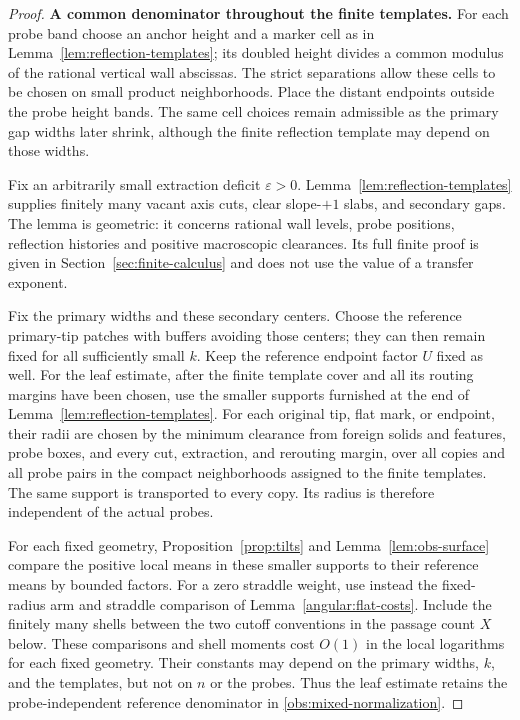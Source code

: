 \begin{proof}
\textbf{A common denominator throughout the finite templates.}\quad
For each probe band choose an anchor height and a marker cell as in
Lemma~\ref{lem:reflection-templates}; its doubled height divides a
common modulus of the rational vertical wall abscissas.  The strict
separations allow these cells to be chosen on small product
neighborhoods.  Place the distant endpoints outside the probe height
bands.  The same cell choices remain admissible as the primary gap
widths later shrink, although the finite reflection template may
depend on those widths.

Fix an arbitrarily small extraction deficit $\varepsilon>0$.
Lemma~\ref{lem:reflection-templates} supplies finitely many vacant
axis cuts, clear slope-$+1$ slabs, and secondary gaps.  The lemma is
geometric: it concerns rational wall levels, probe positions,
reflection histories and positive macroscopic clearances.  Its full
finite proof is given in Section~\ref{sec:finite-calculus} and does
not use the value of a transfer exponent.

Fix the primary widths and these secondary centers.  Choose the
reference primary-tip patches with buffers avoiding those centers;
they can then remain fixed for all sufficiently small $k$.  Keep
the reference endpoint factor $U$ fixed as well.  For the leaf
estimate, after the finite template cover and all its routing
margins have been chosen, use the smaller supports furnished at the
end of Lemma~\ref{lem:reflection-templates}.  For each original
tip, flat mark, or endpoint, their radii are chosen by the minimum
clearance from foreign solids and features, probe boxes, and every
cut, extraction, and rerouting margin, over all copies and all probe
pairs in the compact neighborhoods assigned to the finite templates.
The same support is transported to every copy.  Its radius is
therefore independent of the actual probes.

For each fixed geometry, Proposition~\ref{prop:tilts} and
Lemma~\ref{lem:obs-surface} compare the positive local means in
these smaller supports to their reference means by bounded factors.
For a zero straddle weight, use instead the fixed-radius arm and
straddle comparison of Lemma~\ref{angular:flat-costs}.  Include the
finitely many shells between the two cutoff conventions in the
passage count $X$ below.  These comparisons and shell moments cost
$O(1)$ in the local logarithms for each fixed geometry.  Their
constants may depend on the primary widths, $k$, and the templates,
but not on $n$ or the probes.  Thus the leaf estimate retains the
probe-independent reference denominator in
\eqref{obs:mixed-normalization}.


\end{proof}
